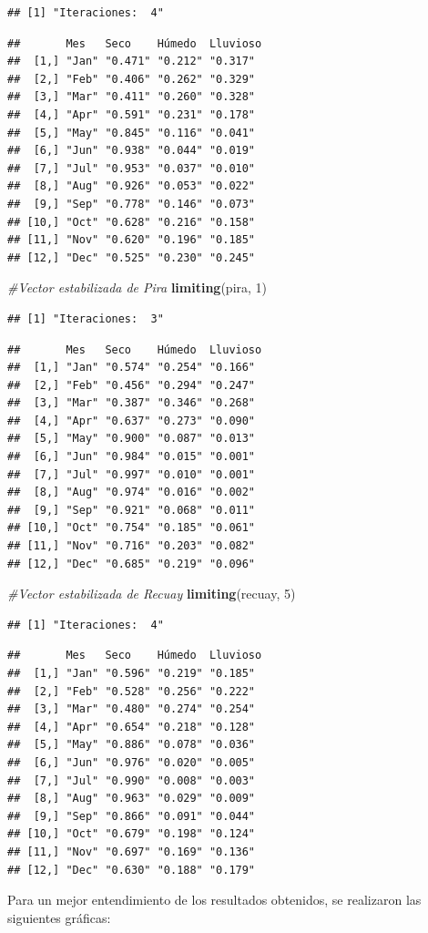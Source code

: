 \documentclass{article}
\newenvironment{Shaded}{\begin{snugshade}}{\end{snugshade}}
\newcommand{\CommentTok}[1]{\textcolor[rgb]{0.56,0.35,0.01}{\textit{#1}}}
\newcommand{\DecValTok}[1]{\textcolor[rgb]{0.00,0.00,0.81}{#1}}
\newcommand{\KeywordTok}[1]{\textcolor[rgb]{0.13,0.29,0.53}{\textbf{#1}}}
\newcommand{\NormalTok}[1]{#1}
\begin{document}
\begin{verbatim}
## [1] "Iteraciones:  4"
\end{verbatim}
\begin{verbatim}
##       Mes   Seco    Húmedo  Lluvioso
##  [1,] "Jan" "0.471" "0.212" "0.317" 
##  [2,] "Feb" "0.406" "0.262" "0.329" 
##  [3,] "Mar" "0.411" "0.260" "0.328" 
##  [4,] "Apr" "0.591" "0.231" "0.178" 
##  [5,] "May" "0.845" "0.116" "0.041" 
##  [6,] "Jun" "0.938" "0.044" "0.019" 
##  [7,] "Jul" "0.953" "0.037" "0.010" 
##  [8,] "Aug" "0.926" "0.053" "0.022" 
##  [9,] "Sep" "0.778" "0.146" "0.073" 
## [10,] "Oct" "0.628" "0.216" "0.158" 
## [11,] "Nov" "0.620" "0.196" "0.185" 
## [12,] "Dec" "0.525" "0.230" "0.245"
\end{verbatim}

\begin{Shaded}
\begin{Highlighting}[]
\CommentTok{#Vector estabilizada de Pira}
\KeywordTok{limiting}\NormalTok{(pira, }\DecValTok{1}\NormalTok{)}
\end{Highlighting}
\end{Shaded}

\begin{verbatim}
## [1] "Iteraciones:  3"
\end{verbatim}
\begin{verbatim}
##       Mes   Seco    Húmedo  Lluvioso
##  [1,] "Jan" "0.574" "0.254" "0.166" 
##  [2,] "Feb" "0.456" "0.294" "0.247" 
##  [3,] "Mar" "0.387" "0.346" "0.268" 
##  [4,] "Apr" "0.637" "0.273" "0.090" 
##  [5,] "May" "0.900" "0.087" "0.013" 
##  [6,] "Jun" "0.984" "0.015" "0.001" 
##  [7,] "Jul" "0.997" "0.010" "0.001" 
##  [8,] "Aug" "0.974" "0.016" "0.002" 
##  [9,] "Sep" "0.921" "0.068" "0.011" 
## [10,] "Oct" "0.754" "0.185" "0.061" 
## [11,] "Nov" "0.716" "0.203" "0.082" 
## [12,] "Dec" "0.685" "0.219" "0.096"
\end{verbatim}
\begin{Shaded}
\begin{Highlighting}[]
\CommentTok{#Vector estabilizada de Recuay}
\KeywordTok{limiting}\NormalTok{(recuay, }\DecValTok{5}\NormalTok{)}
\end{Highlighting}
\end{Shaded}

\begin{verbatim}
## [1] "Iteraciones:  4"
\end{verbatim}
\begin{verbatim}
##       Mes   Seco    Húmedo  Lluvioso
##  [1,] "Jan" "0.596" "0.219" "0.185" 
##  [2,] "Feb" "0.528" "0.256" "0.222" 
##  [3,] "Mar" "0.480" "0.274" "0.254" 
##  [4,] "Apr" "0.654" "0.218" "0.128" 
##  [5,] "May" "0.886" "0.078" "0.036" 
##  [6,] "Jun" "0.976" "0.020" "0.005" 
##  [7,] "Jul" "0.990" "0.008" "0.003" 
##  [8,] "Aug" "0.963" "0.029" "0.009" 
##  [9,] "Sep" "0.866" "0.091" "0.044" 
## [10,] "Oct" "0.679" "0.198" "0.124" 
## [11,] "Nov" "0.697" "0.169" "0.136" 
## [12,] "Dec" "0.630" "0.188" "0.179"
\end{verbatim}
Para un mejor entendimiento de los resultados obtenidos, se realizaron las siguientes gráficas:
\end{document}
